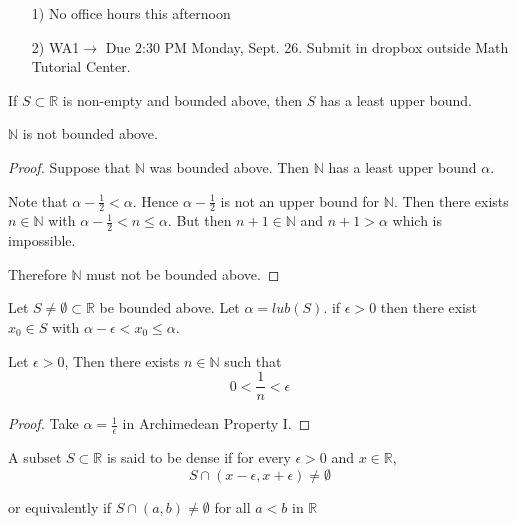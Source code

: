 
\begin{enumerate}
\item[1)] No office hours this afternoon
\item[2)] WA1\(\to\) Due 2:30 PM Monday, Sept. 26. Submit in dropbox outside Math Tutorial Center.
\end{enumerate}

If \(S\subset \mathbb{R}\) is non-empty and bounded above, then \(S\) has a least upper bound.

\begin{thm}
\(\mathbb{N}\) is not bounded above.
\end{thm}

\begin{proof}
Suppose that \(\mathbb{N}\) was bounded above. Then \(\mathbb{N}\) has a least upper bound \(\alpha\). 

Note that \(\alpha - \frac{1}{2} < \alpha \). Hence \(\alpha -\frac{1}{2}\) is not an upper bound for \(\mathbb{N}\). Then there exists \(n\in \mathbb{N}\) with \(\alpha - \frac{1}{2}<n\leq \alpha\). But then \(n+1\in \mathbb{N}\) and \(n+1>\alpha\) which is impossible.

Therefore \(\mathbb{N}\) must not be bounded above.

\end{proof}


\begin{note}
 Let \(S\neq \emptyset\subset\mathbb{R}\) be bounded above.
Let \(\alpha = lub(S)\). if \(\epsilon > 0\) then there exist \(x_0\in S\) with \(\alpha - \epsilon < x_0 \leq \alpha\).
\end{note}


\begin{cor}
Let \(\epsilon > 0 \), Then there exists \(n\in \mathbb{N}\) such that \[0<\frac{1}{n}<\epsilon\]
\end{cor}

\begin{proof}
Take \(\alpha=\frac{1}{\epsilon}\) in Archimedean Property I.
\end{proof}

\begin{defn}
A subset \(S\subset\mathbb{R}\) is said to be dense if for every \(\epsilon > 0\) and \(x\in \mathbb{R}\), \[S\cap (x-\epsilon,x+\epsilon)\neq \emptyset\]

or equivalently if 
\(\displaystyle S\cap (a,b)\neq \emptyset\) for all \(a<b \text{ in } \mathbb{R}\)
\end{defn}

